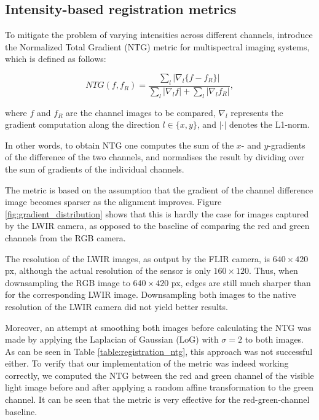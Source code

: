 \documentclass{l4proj}
\begin{document}
\subsection{Intensity-based registration metrics}

To mitigate the problem of varying intensities across different channels, \citet{chen_normalized_2018} introduce the Normalized Total Gradient (NTG) metric for multispectral imaging systems, which is defined as follows:

\begin{equation}
  NTG(f, f_R) = \frac{\sum_l |\nabla_l \{f - f_R\}|}{\sum_l | \nabla_l f | + \sum_l | \nabla_l f_R|},
\end{equation}

where $f$ and $f_R$ are the channel images to be compared, $\nabla_l$ represents the gradient computation along the direction $l \in \{x, y\}$, and $| \cdot |$ denotes the L1-norm.

In other words, to obtain NTG one computes the sum of the $x$- and $y$-gradients of the difference of the two channels, and normalises the result by dividing over the sum of gradients of the individual channels.

The metric is based on the assumption that the gradient of the channel difference image becomes sparser as the alignment improves. Figure \ref{fig:gradient_distribution} shows that this is hardly the case for images captured by the LWIR camera, as opposed to the baseline of comparing the red and green channels from the RGB camera.

The resolution of the LWIR images, as output by the FLIR camera, is $640 \times 420$ px, although the actual resolution of the sensor is only $160 \times 120$. Thus, when downsampling the RGB image to $640 \times 420$ px, edges are still much sharper than for the corresponding LWIR image. Downsampling both images to the native resolution of the LWIR camera did not yield better results.

Moreover, an attempt at smoothing both images before calculating the NTG was made by applying the Laplacian of Gaussian (LoG) with $\sigma=2$ to both images. As can be seen in Table \ref{table:registration_ntg}, this approach was not successful either. To verify that our implementation of the metric was indeed working correctly, we computed the NTG between the red and green channel of the visible light image before and after applying a random affine transformation to the green channel. It can be seen that the metric is very effective for the red-green-channel baseline. 
\end{document}

